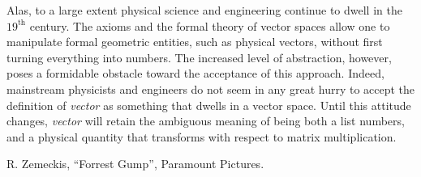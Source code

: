 \documentclass[12pt]{article}
\newcommand{\supth}{^{\text{th}}}
\begin{document}
Alas, to a large extent physical science and engineering continue to
dwell in the $19\supth$ century.  The axioms and the formal theory of
vector spaces allow one to manipulate formal geometric entities, such
as physical vectors, without first turning everything into numbers.
The increased level of abstraction, however, poses a formidable
obstacle toward the acceptance of this approach.  Indeed, mainstream
physicists and engineers do not seem in any great hurry to accept the
definition of {\em vector} as something that dwells in a vector space.
Until this attitude changes, {\em vector} will retain the ambiguous
meaning of being both a list numbers, and a physical quantity that
transforms with respect to matrix multiplication.
\begin{thebibliography}{99}
 R. Zemeckis, ``Forrest Gump'', Paramount Pictures.
\end{thebibliography}
\end{document}
